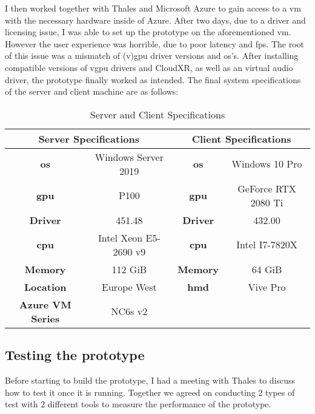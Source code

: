 I then worked together with Thales and Microsoft Azure to gain access to a \acrfull{vm} with the necessary hardware inside of Azure. After two days, due to a driver and licensing issue, I was able to set up the prototype on the aforementioned \acrshort{vm}. However the user experience was horrible, due to poor latency and \acrshort{fps}. The root of this issue was a mismatch of (v)\acrshort{gpu} driver versions and \acrfull{os}'s. After installing compatible versions of v\acrshort{gpu} drivers and CloudXR, as well as an virtual audio driver, the prototype finally worked as intended. The final system specifications of the server and client machine are as follows:

\begin{table}[h]	
\begin{center}
\caption{Server and Client Specifications}
\begin{tabular}{ |c|c|c|c| } 
\hline
\multicolumn{2}{|c|}{Server Specifications} & \multicolumn{2}{|c|}{Client Specifications}\\ 
\hline\hline
\textbf{\acrshort{os}} & Windows Server 2019  &  \textbf{\acrshort{os}} & Windows 10 Pro\\ 
\hline
\textbf{\acrshort{gpu}} & P100 & \textbf{\acrshort{gpu}} & GeForce RTX 2080 Ti\\ 
\hline
\textbf{Driver} & 451.48 &  \textbf{Driver} & 432.00\\ 
\hline
\textbf{\acrshort{cpu}} & Intel Xeon E5-2690 v9 & \textbf{\acrshort{cpu}} & Intel I7-7820X\\
\hline
\textbf{Memory} & 112 GiB & \textbf{Memory} & 64 GiB\\
\hline
\textbf{Location} & Europe West & \textbf{\acrshort{hmd}} & Vive Pro\\
\hline
\textbf{Azure VM Series} & NC6s v2 & & \\
\hline
\end{tabular}
\end{center}

\end{table}

\subsection{Testing the prototype}
Before starting to build the prototype, I had a meeting with Thales to discuss how to test it once it is running. Together we agreed on conducting 2 types of test with 2 different tools to measure the performance of the prototype.

